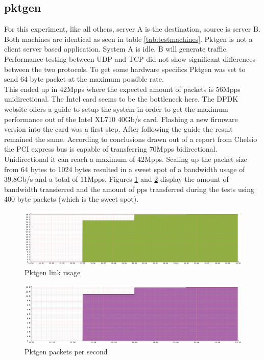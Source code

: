 \subsection{pktgen}\label{sub:pktgen}
For this experiment, like all others, server A is the destination, source is server B. Both machines are identical as seen in table \ref{tab:testmachines}. Pktgen is not a client server based application. System A is idle, B will generate traffic. Performance testing between UDP and TCP did not show significant differences between the two protocols. To get some hardware specifics Pktgen was set to send 64 byte packet at the maximum possible rate.\\ 
This ended up in 42Mpps where the expected amount of packets is 56Mpps unidirectional. The Intel card seems to be the bottleneck here. The DPDK website offers a guide to setup the system in order to get the maximum performance out of the Intel XL710 40Gb/s card. Flashing a new firmware version into the card was a first step. After following the guide the result remained the same. According to conclusions drawn out of a report from Chelsio \cite{chelsio} the PCI express bus is capable of transferring 70Mpps bidirectional. Unidirectional it can reach a maximum of 42Mpps. Scaling up the packet size from 64 bytes to 1024 bytes resulted in a sweet spot of a bandwidth usage of 39.8Gb/s and a total of 11Mpps. Figures \ref{fig:pktgenlink} and \ref{fig:pktgenpps} display the amount of bandwidth transferred and the amount of pps transferred during the tests using 400 byte packets (which is the sweet spot). 

\begin{figure}
  \includegraphics[scale=0.35]{images/pktgen_link_usage.png}
  \caption{Pktgen link usage}
  \label{fig:pktgenlink}
\end{figure}

\begin{figure}
  \includegraphics[scale=0.35]{images/pktgen_pps.png}
  \caption{Pktgen packets per second}
  \label{fig:pktgenpps}
\end{figure}

